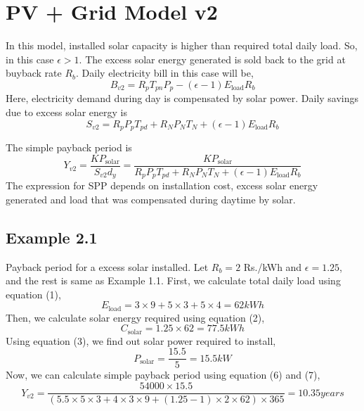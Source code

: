 \documentclass{article}
\begin{document}
\section{PV + Grid Model v2}

In this model, installed solar capacity is higher than required total daily load. So, in this case \( \epsilon > 1\). The excess solar energy generated is sold back to the grid at buyback rate \( R_b \). 
Daily electricity bill in this case will be,
\[
B_{v2} = R_p T_{pn} P_p - (\epsilon - 1) E_{\text{load}} R_b 
\]
Here, electricity demand during day is compensated by solar power. Daily savings due to excess solar energy is
\[
S_{v2} = R_p P_p T_{pd} + R_N P_N T_N + (\epsilon - 1) E_{\text{load}} R_b \tag{6}
\]

The simple payback period is
\[
Y_{v2} = \frac{K P_{\text{solar}}}{S_{v2} d_y}
       = \frac{K P_{\text{solar}}}{R_p P_p T_{pd} + R_N P_N T_N + (\epsilon - 1) E_{\text{load}} R_b} \tag{7}
\]
The expression for SPP depends on installation cost, excess solar energy generated and load that was compensated during daytime by solar.

\subsection{Example 2.1}
Payback period for a excess solar installed. Let \( R_b = 2 \) Rs./kWh and \( \epsilon = 1.25 \), and the rest is same as Example 1.1.
First, we calculate total daily load using equation (1),
\[
E_{\text{load}} = 3 \times 9 + 5 \times 3 + 5 \times 4  
                = 62 kWh 
\]
Then, we calculate solar energy required using equation (2),
\[
C_{\text{solar}} =  1.25 \times 62 
                 =  77.5 kWh 
\]
Using equation (3), we find out solar power required to install,
\[
P_{\text{solar}} = \frac{15.5}{5}
                 = 15.5 kW
\]
Now, we can calculate simple payback period using equation (6) and (7), 
\[
Y_{v2} = \frac{54000 \times 15.5}{(5.5 \times 5 \times 3 + 4 \times 3 \times 9 + (1.25 - 1) \times 2 \times 62) \times 365}
       = 10.35 years
\]
\end{document}
